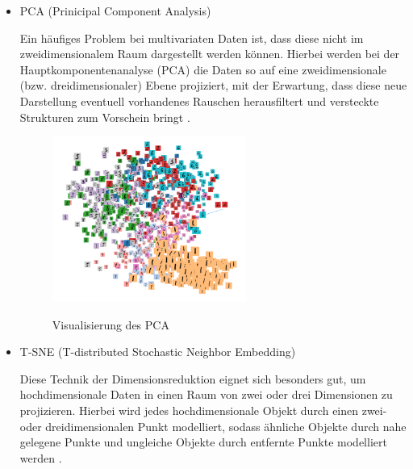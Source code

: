 \begin{itemize} 
\item PCA (Prinicipal Component Analysis) \vspace{10pt}

Ein häufiges Problem bei multivariaten Daten ist, dass diese nicht im zweidimensionalem Raum dargestellt werden können.  Hierbei werden bei der Hauptkomponentenanalyse (PCA) die Daten so auf eine zweidimensionale (bzw. dreidimensionaler) Ebene projiziert, mit der Erwartung, dass diese neue Darstellung eventuell vorhandenes Rauschen herausfiltert und versteckte Strukturen zum Vorschein bringt \cite{pca}.
\begin{figure}[h!]
	\centering
	 \includegraphics[width=0.6\textwidth]{images/Kapitel_3/projektor_pca.png}\\
	\vspace{10pt} 
	\caption[Visualisierung des PCA]{Visualisierung des PCA}
	\label{fig:pca}
\end{figure}



\item T-SNE (T-distributed Stochastic Neighbor Embedding) \vspace{10pt}

Diese Technik der Dimensionsreduktion eignet sich besonders gut, um hochdimensionale Daten in einen Raum von zwei oder drei Dimensionen zu projizieren. Hierbei wird jedes hochdimensionale Objekt durch einen zwei- oder dreidimensionalen Punkt modelliert, sodass ähnliche Objekte durch nahe gelegene Punkte und ungleiche Objekte durch entfernte Punkte modelliert werden \cite{t-sne}.



\end{itemize}
